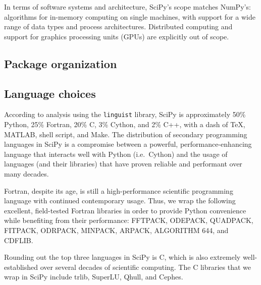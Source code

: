 \documentclass[fleqn,10pt]{wlscirep}
\begin{document}
In terms of software systems and architecture, SciPy's scope matches NumPy's:
algorithms for in-memory computing on single machines, with support for a wide
range of data types and process architectures. Distributed computing and support
for graphics processing units (GPUs) are explicitly out of scope.

\subsection*{Package organization}


\subsection*{Language choices}

According to analysis using the \texttt{linguist} library\cite{linguistref}, SciPy is approximately 50\% Python, 25\% Fortran, 20\% C, 3\% Cython, and 2\% C++, with a dash of \TeX, MATLAB, shell script, and Make. The distribution of secondary programming languages in SciPy is a compromise between a powerful, performance-enhancing language that interacts well with Python (i.e.\ Cython) and the usage of languages (and their libraries) that have proven reliable and performant over many decades.

Fortran, despite its age, is still a high-performance scientific programming language with
continued contemporary usage\cite{Koelbel:1993:HPF:562354}. Thus, we wrap the following excellent, field-tested Fortran
libraries in order to provide Python convenience while benefiting from their performance:
FFTPACK\cite{SWARZTRAUBER198445, SWARZTRAUBER198251}, %
ODEPACK\cite{hindmarsh1983odepack}, %
QUADPACK\cite{piessens1983quadpack}, %
FITPACK\cite{Dierckx:1993:CSF:151103}, %
ODRPACK\cite{ODRPACK_Boggs}, %
MINPACK\cite{osti_6997568}, %
ARPACK\cite{leh:sor:yan96}, %
ALGORITHM 644\cite{Amos:1986:APP:7921.214331}, and %
CDFLIB\cite{CDFLIB_site}. %

Rounding out the top three languages in SciPy is C, which is also extremely
well-established over several decades\cite{Kernighan:1988:CPL:576122} of
scientific computing. The C libraries that we wrap in SciPy include
trlib\cite{doi:10.1080/10556788.2018.1449842}, %
SuperLU\cite{li05,superlu_ug99}, %
Qhull\cite{Barber:1996:QAC:235815.235821}, and %
Cephes\cite{cephes_netlib}. %
\end{document}
